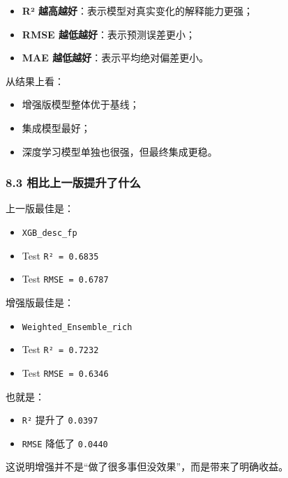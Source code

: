 \documentclass[
  ,
]{ctexart}
\providecommand{\tightlist}{%
  \setlength{\itemsep}{0pt}\setlength{\parskip}{0pt}}
\begin{document}
\begin{itemize}
\tightlist
\item
  \textbf{R² 越高越好}：表示模型对真实变化的解释能力更强；
\item
  \textbf{RMSE 越低越好}：表示预测误差更小；
\item
  \textbf{MAE 越低越好}：表示平均绝对偏差更小。
\end{itemize}

从结果上看：

\begin{itemize}
\tightlist
\item
  增强版模型整体优于基线；
\item
  集成模型最好；
\item
  深度学习模型单独也很强，但最终集成更稳。
\end{itemize}

\hypertarget{ux76f8ux6bd4ux4e0aux4e00ux7248ux63d0ux5347ux4e86ux4ec0ux4e48}{%
\subsubsection{8.3
相比上一版提升了什么}\label{ux76f8ux6bd4ux4e0aux4e00ux7248ux63d0ux5347ux4e86ux4ec0ux4e48}}

上一版最佳是：

\begin{itemize}
\tightlist
\item
  \texttt{XGB\_desc\_fp}
\item
  Test \texttt{R²\ =\ 0.6835}
\item
  Test \texttt{RMSE\ =\ 0.6787}
\end{itemize}

增强版最佳是：

\begin{itemize}
\tightlist
\item
  \texttt{Weighted\_Ensemble\_rich}
\item
  Test \texttt{R²\ =\ 0.7232}
\item
  Test \texttt{RMSE\ =\ 0.6346}
\end{itemize}

也就是：

\begin{itemize}
\tightlist
\item
  \texttt{R²} 提升了 \texttt{0.0397}
\item
  \texttt{RMSE} 降低了 \texttt{0.0440}
\end{itemize}

这说明增强并不是``做了很多事但没效果''，而是带来了明确收益。
\end{document}
